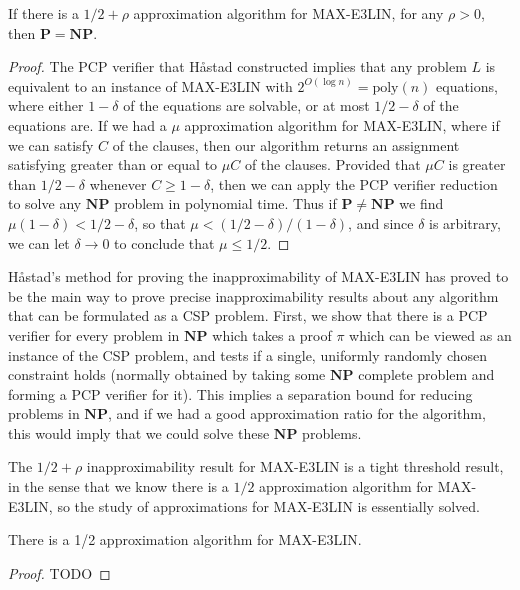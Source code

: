 \begin{theorem}
    If there is a $1/2 + \rho$ approximation algorithm for MAX-E3LIN, for any $\rho > 0$, then $\mathbf{P} = \mathbf{NP}$.
\end{theorem}
\begin{proof}
    The PCP verifier that Håstad constructed implies that any problem $L$ is equivalent to an instance of MAX-E3LIN with $2^{O(\log n)} = \text{poly}(n)$ equations, where either $1 - \delta$ of the equations are solvable, or at most $1/2 - \delta$ of the equations are. If we had a $\mu$ approximation algorithm for MAX-E3LIN, where if we can satisfy $C$ of the clauses, then our algorithm returns an assignment satisfying greater than or equal to $\mu C$ of the clauses. Provided that $\mu C$ is greater than $1/2 - \delta$ whenever $C \geq 1 - \delta$, then we can apply the PCP verifier reduction to solve any $\mathbf{NP}$ problem in polynomial time. Thus if $\mathbf{P} \neq \mathbf{NP}$ we find $\mu(1 - \delta) < 1/2 - \delta$, so that $\mu < (1/2 - \delta)/(1 - \delta)$, and since $\delta$ is arbitrary, we can let $\delta \to 0$ to conclude that $\mu \leq 1/2$.
\end{proof}

Håstad's method for proving the inapproximability of MAX-E3LIN has proved to be the main way to prove precise inapproximability results about any algorithm that can be formulated as a CSP problem. First, we show that there is a PCP verifier for every problem in $\mathbf{NP}$ which takes a proof $\pi$ which can be viewed as an instance of the CSP problem, and tests if a single, uniformly randomly chosen constraint holds (normally obtained by taking some $\mathbf{NP}$ complete problem and forming a PCP verifier for it). This implies a separation bound for reducing problems in $\mathbf{NP}$, and if we had a good approximation ratio for the algorithm, this would imply that we could solve these $\mathbf{NP}$ problems.

The $1/2 + \rho$ inapproximability result for MAX-E3LIN is a tight threshold result, in the sense that we know there is a $1/2$ approximation algorithm for MAX-E3LIN, so the study of approximations for MAX-E3LIN is essentially solved.

\begin{theorem}
    There is a 1/2 approximation algorithm for MAX-E3LIN.
\end{theorem}
\begin{proof}
    TODO
\end{proof}

